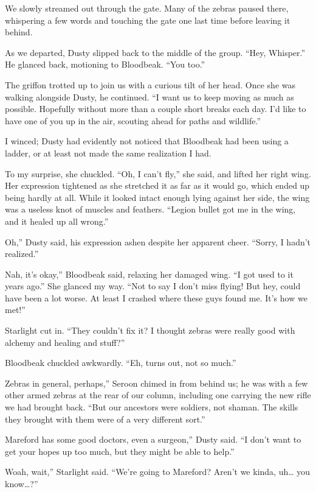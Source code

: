 We slowly streamed out through the gate. Many of the zebras paused there, whispering a few words and touching the gate one last time before leaving it behind.

As we departed, Dusty slipped back to the middle of the group. “Hey, Whisper.” He glanced back, motioning to Bloodbeak. “You too.”

The griffon trotted up to join us with a curious tilt of her head. Once she was walking alongside Dusty, he continued. “I want us to keep moving as much as possible. Hopefully without more than a couple short breaks each day. I’d like to have one of you up in the air, scouting ahead for paths and wildlife.”

I winced; Dusty had evidently not noticed that Bloodbeak had been using a ladder, or at least not made the same realization I had.

To my surprise, she chuckled. “Oh, I can’t fly,” she said, and lifted her right wing. Her expression tightened as she stretched it as far as it would go, which ended up being hardly at all. While it looked intact enough lying against her side, the wing was a useless knot of muscles and feathers. “Legion bullet got me in the wing, and it healed up all wrong.”

\leavevmode{}Oh,” Dusty said, his expression ashen despite her apparent cheer. “Sorry, I hadn’t realized.”

\leavevmode{}Nah, it’s okay,” Bloodbeak said, relaxing her damaged wing. “I got used to it years ago.” She glanced my way. “Not to say I don’t miss flying! But hey, could have been a lot worse. At least I crashed where these guys found me. It’s how we met!”

Starlight cut in. “They couldn’t fix it? I thought zebras were really good with alchemy and healing and stuff?”

Bloodbeak chuckled awkwardly. “Eh, turns out, not so much.”

\leavevmode{}Zebras in general, perhaps,” Seroon chimed in from behind us; he was with a few other armed zebras at the rear of our column, including one carrying the new rifle we had brought back. “But our ancestors were soldiers, not shaman. The skills they brought with them were of a very different sort.”

\leavevmode{}Mareford has some good doctors, even a surgeon,” Dusty said. “I don’t want to get your hopes up too much, but they might be able to help.”

\leavevmode{}Woah, wait,” Starlight said. “We’re going to Mareford? Aren’t we kinda, uh… you know…?”

